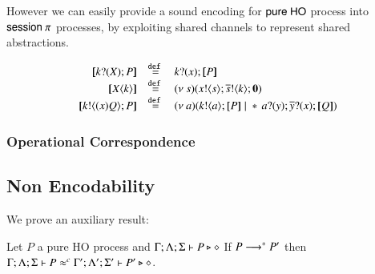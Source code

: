 However we can easily provide a sound encoding for $\mathsf{pure\ HO}$
process into $\mathsf{session\ }\pi$ processes, by exploiting shared channels
to represent shared abstractions.

\[
\begin{array}{rcl}
	\map{\binp{k}{\X} P} &\defeq& \binp{k}{x} \map{P}\\
	\map{\appl{\X}{k}} &\defeq& \newsp{s}{\bout{x}{s} \bout{\dual{s}}{k} \inact}\\
	\map{\bout{k}{\abs{x} Q} P} &\defeq& \newsp{a}{\bout{k}{a} \map{P} \Par \repl{} \binp{a}{y} \binp{\dual{y}}{x} \map{Q}}
\end{array}
\]

\subsubsection{Operational Correspondence}


\subsection{Non Encodability}


We prove an auxiliary result:

\begin{lemma}
	\label{lem:tau_inert}
	Let $P$ a pure HO process
	and $\Gamma; \Lambda; \Sigma \vdash P \triangleright \diamond$
	If $P \longrightarrow^* P'$ then
	$\Gamma; \Lambda; \Sigma \vdash P \approx^{c} \Gamma'; \Lambda'; \Sigma' \vdash P' \triangleright \diamond$.
\end{lemma}

